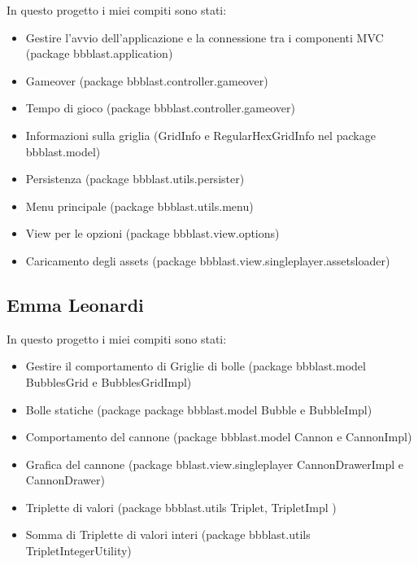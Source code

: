 \documentclass[a4paper,12pt]{report}
\begin{document}
In questo progetto i miei compiti sono stati:
\begin{itemize}
	\item Gestire l'avvio dell'applicazione e la connessione tra i componenti MVC (package bbblast.application)
	\item Gameover (package bbblast.controller.gameover)
	\item Tempo di gioco (package bbblast.controller.gameover)
	\item Informazioni sulla griglia (GridInfo e RegularHexGridInfo nel package bbblast.model)
	\item Persistenza (package bbblast.utils.persister)
	\item Menu principale (package bbblast.utils.menu)
	\item View per le opzioni (package bbblast.view.options)
	\item Caricamento degli assets (package bbblast.view.singleplayer.assetsloader)
\end{itemize}

\subsection{Emma Leonardi}

In questo progetto i miei compiti sono stati:
\begin{itemize}
	\item Gestire il comportamento di Griglie di bolle (package bbblast.model BubblesGrid e BubblesGridImpl)
	\item Bolle statiche (package package bbblast.model Bubble e BubbleImpl)
	\item Comportamento del cannone (package bbblast.model Cannon e CannonImpl)
	\item Grafica del cannone (package bblast.view.singleplayer CannonDrawerImpl e CannonDrawer)
	\item Triplette di valori (package bbblast.utils Triplet, TripletImpl )
	\item Somma di Triplette di valori interi (package bbblast.utils TripletIntegerUtility)
\end{itemize}
\end{document}
